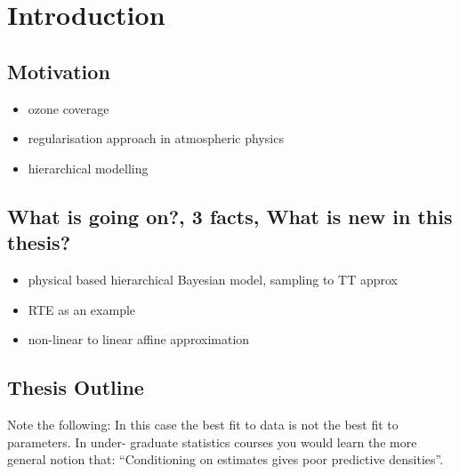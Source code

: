 \chapter{Introduction}
\section{Motivation}
\begin{itemize}
	\item ozone coverage
	\item regularisation approach in atmospheric physics
	\item hierarchical modelling
\end{itemize}
\section{What is going on?, 3 facts, What is new in this thesis?}
\begin{itemize}
	\item physical based hierarchical Bayesian model, sampling to TT approx
	\item RTE as an example
	\item non-linear to linear affine approximation
\end{itemize}

\section{Thesis Outline}

Note the following:
In this case the best fit to data is not the best fit to parameters.
 In under-
graduate statistics courses you would learn the more general notion that: “Conditioning
on estimates gives poor predictive densities”.
\cite{tan2016LecNot}